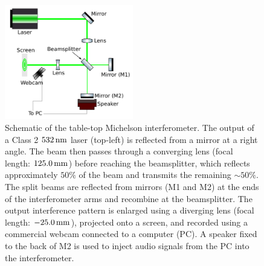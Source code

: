 \documentclass[paper-main.tex]{subfiles}
\begin{document}
\begin{figure}
	\includegraphics[width=0.5\textwidth]{figures/ifo_schematic_webcam_edit.pdf}
	\caption{\label{fig:ifo_schematic_webcam}
Schematic of the table-top Michelson interferometer. 
The output of a Class 2 $532\,{\rm nm}$ laser (top-left) is reflected from a mirror at a right angle. The beam then passes through a converging lens (focal length: $125.0\,{\rm mm}$) before reaching the beamsplitter, which reflects approximately $50\%$ of the beam and transmits the remaining $\sim50\%$.
The split beams are reflected from mirrors (M1 and M2) at the ends of the interferometer arms and recombine at the beamsplitter. 
The output interference pattern is enlarged using a diverging lens (focal length: $-25.0\,{\rm mm}$), projected onto a screen, and recorded using a commercial webcam connected to a computer (PC). 
A speaker fixed to the back of M2 is used to inject audio signals from the PC into the interferometer.
    }
\end{figure}
\end{document}
